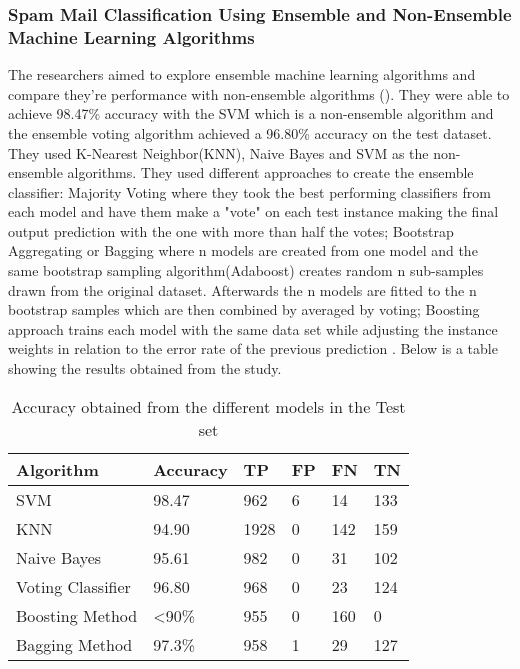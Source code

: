 \subsubsection{Spam Mail Classification Using Ensemble and Non-Ensemble Machine Learning Algorithms}
The researchers aimed to explore ensemble machine learning algorithms and compare they're performance with non-ensemble algorithms (\cite{agarwal_uniyal_virendrasingh_krishna_dutt_2020}). They were able to achieve 98.47\% accuracy with the SVM which is a non-ensemble algorithm and the ensemble voting algorithm achieved a 96.80\% accuracy on the test dataset. They used K-Nearest Neighbor(KNN), Naive Bayes and SVM as the non-ensemble algorithms. They used different approaches to create the ensemble classifier: Majority Voting where they took the best performing classifiers from each model and have them make a "vote" on each test instance making the final output prediction with the one with more than half the votes; Bootstrap Aggregating or Bagging where n models are created from one model and the same bootstrap sampling algorithm(Adaboost) creates random n sub-samples drawn from the original dataset. Afterwards the n models are fitted to the n bootstrap samples which are then combined by averaged by voting; Boosting approach trains each model with the same data set while adjusting the instance weights in relation to the error rate of the previous prediction \cite{agarwal_uniyal_virendrasingh_krishna_dutt_2020}.
Below is a table showing the results obtained from the study.
\begin{table}[H]
    \centering
    \begin{tabular}{|p{4cm}|p{2cm}|p{2cm}|p{2cm}|p{2cm}|p{2cm}|}
        \hline
        Algorithm & Accuracy & TP & FP & FN & TN\\
        \hline
        SVM & 98.47 & 962 & 6 & 14 & 133\\
        \hline
        KNN & 94.90 & 1928 & 0 & 142 & 159\\
        \hline
        Naive Bayes & 95.61 & 982 & 0 & 31 & 102\\
        \hline
        Voting Classifier & 96.80 & 968 & 0 & 23 & 124\\
        \hline
        Boosting Method & <90\% & 955 & 0 & 160 & 0\\
        \hline
        Bagging Method & 97.3\% & 958 & 1 & 29 & 127\\
        \hline
    \end{tabular}
    \caption{Accuracy obtained from the different models in the Test set}
    \label{tab:ensemble}
\end{table}